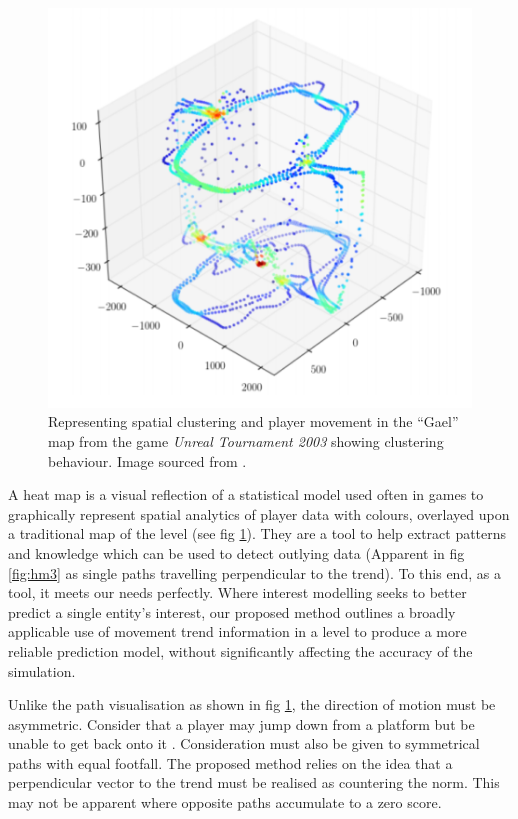 \documentclass[journal]{IEEEtran}
\begin{document}
\begin{figure}[h]
    \centering
    \includegraphics[width=0.9\linewidth]{heatmap4.png}
    \caption{Representing spatial clustering and player movement in the ``Gael'' map from the game \textit{Unreal Tournament 2003} showing clustering behaviour. Image sourced from \cite{bauckhage2014beyond}.}
    \label{fig:hm2}
\end{figure}

A heat map is a visual reflection of a statistical model \cite{wilkinson2009history} used often in games to graphically represent spatial analytics of player data with colours, overlayed upon a traditional map of the level (see fig \ref{fig:hm2}). They are a tool to help extract patterns and knowledge which can be used to detect outlying data \cite{drachen2013spatial} (Apparent in fig \ref{fig:hm3} as single paths travelling perpendicular to the trend). To this end, as a tool, it meets our needs perfectly. Where interest modelling seeks to better predict a single entity's interest, our proposed method outlines a broadly applicable use of movement trend information in a level to produce a more reliable prediction model, without significantly affecting the accuracy of the simulation.

Unlike the path visualisation as shown in fig \ref{fig:hm2}, the direction of motion must be asymmetric. Consider that a player may jump down from a platform but be unable to get back onto it \cite{bauckhage2014beyond}. Consideration must also be given to symmetrical paths with equal footfall. The proposed method relies on the idea that a perpendicular vector to the trend must be realised as countering the norm. This may not be apparent where opposite paths accumulate to a zero score.
\end{document}
